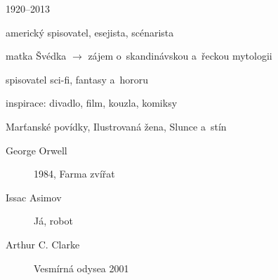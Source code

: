 {\parag{\getauthor}
\begin{compactitem}
	\item 1920--2013
	\item americký spisovatel, esejista, scénarista
	\item matka Švédka $\rightarrow$ zájem o~skandinávskou a~řeckou mytologii
	\item spisovatel sci-fi, fantasy a~hororu
	\item inspirace: divadlo, film, kouzla, komiksy
	\item Marťanské povídky, Ilustrovaná žena, Slunce a~stín
\end{compactitem}

\begin{description}
	\item[George Orwell] 1984, Farma zvířat
	\item[Issac Asimov] Já, robot
	\item[Arthur C. Clarke] Vesmírná odysea 2001
\end{description}
}
